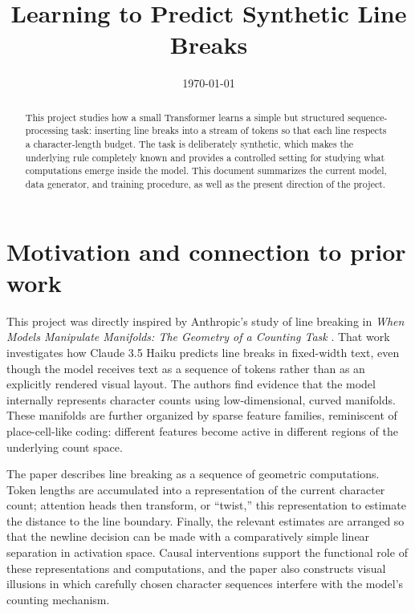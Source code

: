 \documentclass[11pt]{article}
\title{Learning to Predict Synthetic Line Breaks}
\author{}
\date{\today}
\begin{document}
\maketitle

\begin{abstract}
This project studies how a small Transformer learns a simple but structured
sequence-processing task: inserting line breaks into a stream of tokens so
that each line respects a character-length budget.  The task is deliberately
synthetic, which makes the underlying rule completely known and provides a
controlled setting for studying what computations emerge inside the model.
This document summarizes the current model, data generator, and training
procedure, as well as the present direction of the project.
\end{abstract}

\section{Motivation and connection to prior work}

This project was directly inspired by Anthropic's study of line breaking in
\emph{When Models Manipulate Manifolds: The Geometry of a Counting Task}
\cite{gurnee2026manipulate}.  That work investigates how Claude 3.5 Haiku
predicts line breaks in fixed-width text, even though the model receives text
as a sequence of tokens rather than as an explicitly rendered visual layout.
The authors find evidence that the model internally represents character
counts using low-dimensional, curved manifolds.  These manifolds are further
organized by sparse feature families, reminiscent of place-cell-like coding:
different features become active in different regions of the underlying count
space.

The paper describes line breaking as a sequence of geometric computations.
Token lengths are accumulated into a representation of the current character
count; attention heads then transform, or ``twist,'' this representation to
estimate the distance to the line boundary.  Finally, the relevant estimates
are arranged so that the newline decision can be made with a comparatively
simple linear separation in activation space.  Causal interventions support
the functional role of these representations and computations, and the paper
also constructs visual illusions in which carefully chosen character
sequences interfere with the model's counting mechanism.
\end{document}
